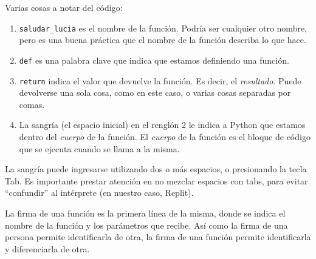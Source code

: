 \documentclass[
  letterpaper,
  DIV=11,
  numbers=noendperiod]{scrreprt}
\providecommand{\tightlist}{%
  \setlength{\itemsep}{0pt}\setlength{\parskip}{0pt}}\usepackage{longtable,booktabs,array}
\begin{document}
Varias cosas a notar del código:

\begin{enumerate}
\def\labelenumi{\arabic{enumi}.}
\tightlist
\item
  \texttt{saludar\_lucia} es el nombre de la función. Podría ser
  cualquier otro nombre, pero es una buena práctica que el nombre de la
  función describa lo que hace.\\
\item
  \texttt{def} es una palabra clave que indica que estamos definiendo
  una función.\\
\item
  \texttt{return} indica el valor que devuelve la función. Es decir, el
  \emph{resultado}. Puede devolverse una sola cosa, como en este caso, o
  varias cosas separadas por comas.\\
\item
  La sangría (el espacio inicial) en el renglón 2 le indica a Python que
  estamos dentro del \emph{cuerpo} de la función. El \emph{cuerpo} de la
  función es el bloque de código que se ejecuta cuando se llama a la
  misma.\\
\end{enumerate}

\begin{tcolorbox}[enhanced jigsaw, opacitybacktitle=0.6, toptitle=1mm, toprule=.15mm, arc=.35mm, breakable, bottomrule=.15mm, opacityback=0, leftrule=.75mm, rightrule=.15mm, title=\textcolor{quarto-callout-note-color}{\faInfo}\hspace{0.5em}{Sangría}, left=2mm, bottomtitle=1mm, colframe=quarto-callout-note-color-frame, colback=white, titlerule=0mm, coltitle=black, colbacktitle=quarto-callout-note-color!10!white]

La sangría puede ingresarse utilizando dos o más espacios, o presionando
la tecla Tab. Es importante prestar atención en no mezclar espacios con
tabs, para evitar ``confundir'' al intérprete (en nuestro caso, Replit).

\end{tcolorbox}

\begin{tcolorbox}[enhanced jigsaw, opacitybacktitle=0.6, toptitle=1mm, toprule=.15mm, arc=.35mm, breakable, bottomrule=.15mm, opacityback=0, leftrule=.75mm, rightrule=.15mm, title=\textcolor{quarto-callout-tip-color}{\faLightbulb}\hspace{0.5em}{Firma de la función}, left=2mm, bottomtitle=1mm, colframe=quarto-callout-tip-color-frame, colback=white, titlerule=0mm, coltitle=black, colbacktitle=quarto-callout-tip-color!10!white]

La firma de una función es la primera línea de la misma, donde se indica
el nombre de la función y los parámetros que recibe. Así como la firma
de una persona permite identificarla de otra, la firma de una función
permite identificarla y diferenciarla de otra.

\end{tcolorbox}
\end{document}
